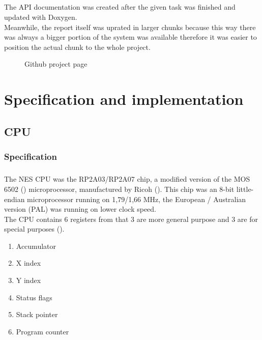 \documentclass[]{report}
\begin{document}
\paragraph{ }
The API documentation was created after the given task was finished and updated with Doxygen.
\\
Meanwhile, the report itself was uprated in larger chunks because this way there was always a bigger portion of the system was available therefore it was easier to position the actual chunk to the whole project.

\begin{figure}[!htb]
\caption{\label{fig:my-label} Github project page}
\end{figure}
\clearpage

\chapter{Specification and implementation}

\section{CPU}

\subsection{Specification}

\paragraph{ }
The NES CPU was the RP2A03/RP2A07 chip, a modified version of the MOS 6502 (\cite{6502}) microprocessor, manufactured by Ricoh (\cite{RCHO}). This chip was an 8-bit little-endian microprocessor running on 1,79/1,66 MHz, the European / Australian version (PAL) was running on lower clock speed.
\\
The CPU contains 6 registers from that 3 are more general purpose and 3 are for special purposes (\cite{REGS}).
\begin{enumerate}
	\item Accumulator
	\item X index
	\item Y index
	\item Status flags
	\item Stack  pointer
	\item Program counter
\end{enumerate}
\end{document}
